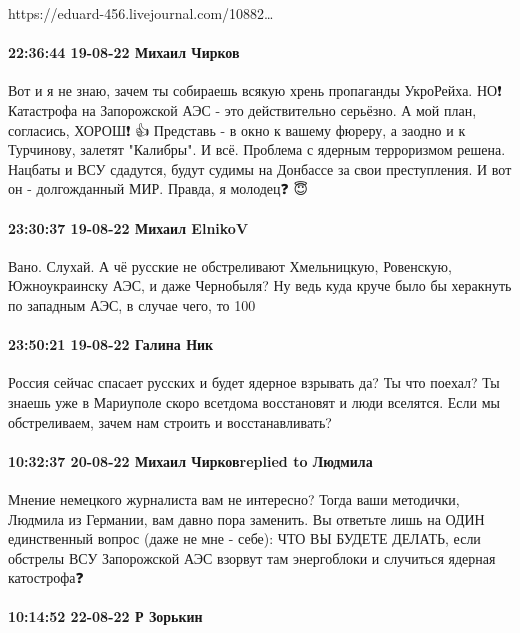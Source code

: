 https://eduard-456.livejournal.com/10882…

\paragraph{22:36:44 19-08-22 Михаил Чирков}

Вот и я не знаю, зачем ты собираешь всякую хрень пропаганды УкроРейха.
НО❗
Катастрофа на Запорожской АЭС - это действительно серьёзно.
А мой план, согласись, ХОРОШ❗ 👍
Представь - в окно к вашему фюреру, а заодно и к Турчинову, залетят "Калибры". И всё.
Проблема с ядерным терроризмом решена.
Нацбаты и ВСУ сдадутся, будут судимы на Донбассе за свои преступления.
И вот он - долгожданный МИР.
Правда, я молодец❓ 😇

\paragraph{23:30:37 19-08-22 Михаил ElnikoV}

Вано. Слухай.
А чё русские не обстреливают Хмельницкую, Ровенскую, Южноукраинску АЭС, и даже Чернобыля?
Ну ведь куда круче было бы херакнуть по западным АЭС, в случае чего, то 100%

\paragraph{23:50:21 19-08-22 Галина Ник}

Россия сейчас спасает русских и будет ядерное взрывать да? Ты что поехал? Ты
знаешь уже в Мариуполе скоро всетдома восстановят и люди вселятся. Если мы
обстреливаем, зачем нам строить и восстанавливать?

\paragraph{10:32:37 20-08-22 Михаил Чирковreplied to Людмила}

Мнение немецкого журналиста вам не интересно?
Тогда ваши методички, Людмила из Германии, вам давно пора заменить.
Вы ответьте лишь на ОДИН единственный вопрос (даже не мне - себе):
ЧТО ВЫ БУДЕТЕ ДЕЛАТЬ, если обстрелы ВСУ Запорожской АЭС взорвут там энергоблоки и случиться ядерная катострофа❓

\paragraph{10:14:52 22-08-22 Р Зорькин}

